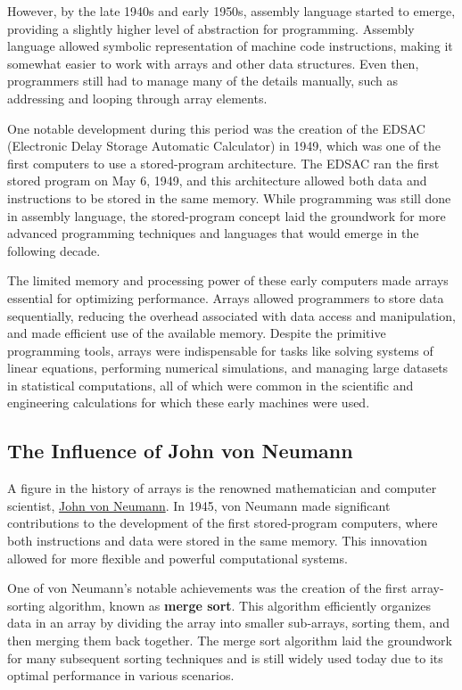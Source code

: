 \documentclass{book}
\begin{document}
	However, by the late 1940s and early 1950s, assembly language started to emerge, providing a slightly higher level of abstraction for programming. Assembly language allowed symbolic representation of machine code instructions, making it somewhat easier to work with arrays and other data structures. Even then, programmers still had to manage many of the details manually, such as addressing and looping through array elements.
	
	One notable development during this period was the creation of the EDSAC (Electronic Delay Storage Automatic Calculator) in 1949, which was one of the first computers to use a stored-program architecture. The EDSAC ran the first stored program on May 6, 1949, and this architecture allowed both data and instructions to be stored in the same memory. While programming was still done in assembly language, the stored-program concept laid the groundwork for more advanced programming techniques and languages that would emerge in the following decade.
	
	The limited memory and processing power of these early computers made arrays essential for optimizing performance. Arrays allowed programmers to store data sequentially, reducing the overhead associated with data access and manipulation, and made efficient use of the available memory. Despite the primitive programming tools, arrays were indispensable for tasks like solving systems of linear equations, performing numerical simulations, and managing large datasets in statistical computations, all of which were common in the scientific and engineering calculations for which these early machines were used.
	
	\subsection{The Influence of John von Neumann}
	
	A figure in the history of arrays is the renowned mathematician and computer scientist, \href{https://en.wikipedia.org/wiki/John_von_Neumann#Computer_science}{John von Neumann}. In 1945, von Neumann made significant contributions to the development of the first stored-program computers, where both instructions and data were stored in the same memory. This innovation allowed for more flexible and powerful computational systems.
	
	One of von Neumann's notable achievements was the creation of the first array-sorting algorithm, known as \textbf{merge sort}. This algorithm efficiently organizes data in an array by dividing the array into smaller sub-arrays, sorting them, and then merging them back together. The merge sort algorithm laid the groundwork for many subsequent sorting techniques and is still widely used today due to its optimal performance in various scenarios.
	
\end{document}
